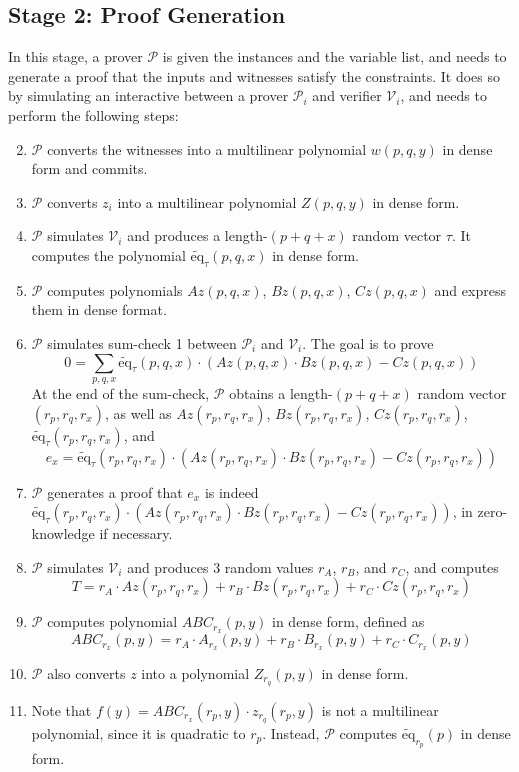 \documentclass{article}
\renewcommand{\P}{\mathcal{P}}
\newcommand{\V}{\mathcal{V}}
\newcommand{\eq}{\widetilde{\mbox{eq}}}
\begin{document}
\subsection{Stage 2: Proof Generation}\label{stage:prover}
In this stage, a prover $\P$ is given the instances and the variable list, and needs to generate a proof that the inputs and witnesses satisfy the constraints. It does so by simulating an interactive between a prover $\P_i$ and verifier $\V_i$, and needs to perform the following steps:
\begin{enumerate}
    \setcounter{enumi}{1}
    \item $\P$ converts the witnesses into a multilinear polynomial $w(p, q, y)$ in dense form and commits.
    \item $\P$ converts $z_i$ into a multilinear polynomial $Z(p, q, y)$ in dense form.
    \item $\P$ simulates $\V_i$ and produces a length-$(p + q + x)$ random vector $\tau$. It computes the polynomial $\eq_{\tau}(p, q, x)$ in dense form.
    \item $\P$ computes polynomials $Az(p, q, x)$, $Bz(p, q, x)$, $Cz(p, q, x)$ and express them in dense format.
    \item $\P$ simulates sum-check 1 between $\P_i$ and $\V_i$. The goal is to prove
    $$\displaystyle0 =\sum_{p, q, x} \eq_\tau(p, q, x)\cdot (Az(p, q, x)\cdot Bz(p, q, x) - Cz(p, q, x))$$
    At the end of the sum-check, $\P$ obtains a length-$(p + q + x)$ random vector $(r_p, r_q, r_x)$, as well as $Az(r_p, r_q, r_x)$, $Bz(r_p, r_q, r_x)$, $Cz(r_p, r_q, r_x)$, $\eq_\tau(r_p, r_q, r_x)$, and
    $$e_x = \eq_\tau(r_p, r_q, r_x)\cdot (Az(r_p, r_q, r_x)\cdot Bz(r_p, r_q, r_x) - Cz(r_p, r_q, r_x))$$
    \item $\P$ generates a proof that $e_x$ is indeed $\eq_\tau(r_p, r_q, r_x)\cdot (Az(r_p, r_q, r_x)\cdot Bz(r_p, r_q, r_x) - Cz(r_p, r_q, r_x))$, in zero-knowledge if necessary.\label{step:p_proof_1}
    \item $\P$ simulates $\V_i$ and produces 3 random values $r_A$, $r_B$, and $r_C$, and computes 
    $$T = r_A\cdot Az(r_p, r_q, r_x) + r_B\cdot Bz(r_p, r_q, r_x) + r_C\cdot Cz(r_p, r_q, r_x)$$
    \item $\P$ computes polynomial $ABC_{r_x}(p, y)$ in dense form, defined as
    $$ABC_{r_x}(p, y) = r_A\cdot A_{r_x}(p, y) + r_B\cdot B_{r_x}(p, y) + r_C\cdot C_{r_x}(p, y)$$
    \item $\P$ also converts $z$ into a polynomial $Z_{r_q}(p, y)$ in dense form.
    \item Note that $f(y) = ABC_{r_x}(r_p, y)\cdot z_{r_q}(r_p, y)$ is not a multilinear polynomial, since it is quadratic to $r_p$. Instead, $\P$ computes $\eq_{r_p}(p)$ in dense form.

\end{enumerate}
\end{document}
